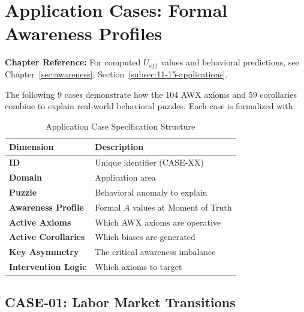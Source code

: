 \section{Application Cases: Formal Awareness Profiles}
\label{sec:application-cases}

\begin{cross-reference}
\textbf{Chapter Reference:} For computed $U_{eff}$ values and behavioral 
predictions, see Chapter~\ref{sec:awareness}, 
Section~\ref{subsec:11-15-applications}.
\end{cross-reference}

The following 9 cases demonstrate how the 104 AWX axioms and 59 corollaries combine to explain real-world behavioral puzzles. Each case is formalized with:

\begin{table}[htbp]
\centering
\caption{Application Case Specification Structure}
\label{tab:case-structure}
\begin{tabular}{lp{10cm}}
\toprule
\textbf{Dimension} & \textbf{Description} \\
\midrule
\textbf{ID} & Unique identifier (CASE-XX) \\
\textbf{Domain} & Application area \\
\textbf{Puzzle} & Behavioral anomaly to explain \\
\textbf{Awareness Profile} & Formal $A$ values at Moment of Truth \\
\textbf{Active Axioms} & Which AWX axioms are operative \\
\textbf{Active Corollaries} & Which biases are generated \\
\textbf{Key Asymmetry} & The critical awareness imbalance \\
\textbf{Intervention Logic} & Which axioms to target \\
\bottomrule
\end{tabular}
\end{table}


\subsection{CASE-01: Labor Market Transitions}

